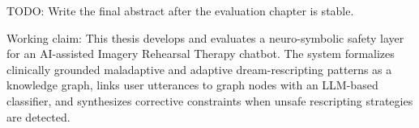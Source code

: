 TODO: Write the final abstract after the evaluation chapter is stable.

Working claim: This thesis develops and evaluates a neuro-symbolic safety layer for an AI-assisted Imagery Rehearsal Therapy chatbot. The system formalizes clinically grounded maladaptive and adaptive dream-rescripting patterns as a knowledge graph, links user utterances to graph nodes with an LLM-based classifier, and synthesizes corrective constraints when unsafe rescripting strategies are detected.
